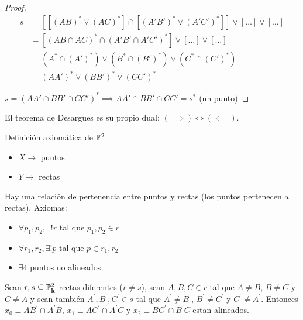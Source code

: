 \begin{proof}
\begin{align*}
    s &= \left[ \left[ \left(AB\right)^* \vee \left(AC\right)^* \right] \cap \left[ \left(A'B'\right)^* \vee \left(A'C'\right)^* \right] \right]
    \vee [\dots ] \vee [\dots] \\
    &= \left[ (AB \cap AC)^* \cap \left(A'B' \cap A'C' \right)^* \right] \vee [\dots] \vee [\dots] \\
    &= \left(A^* \cap (A')^* \right) \vee \left(B^* \cap (B')^* \right) \vee \left(C^* \cap (C')^* \right) \\
    &= (AA')^* \vee (BB')^* \vee (CC')^*
\end{align*}

$s = (AA' \cap BB' \cap CC')^* \implies AA' \cap BB' \cap CC' = s^*$ (un punto)
\end{proof}
\begin{obs}
El teorema de Desargues es su propio dual: $(\implies) \iff (\impliedby)$.
\end{obs}
\begin{obs}
Definición axiomática de $\mathbb{P}^2$
\begin{itemize}
    \item $X \rightarrow$ puntos
    \item $Y \rightarrow$ rectas
\end{itemize}
Hay una relación de pertenencia entre puntos y rectas (los puntos pertenecen a rectas). Axiomas:
\begin{itemize}
    \item $\forall p_1, p_2, \exists! r$ tal que $p_1, p_2 \in r$
    \item $\forall r_1, r_2, \exists! p$ tal que $p \in r_1, r_2$
    \item $\exists 4$ puntos no alineados
\end{itemize}
\end{obs}


\begin{thm}[ de Pappus]
Sean $r,s \subseteq \mathbb{P}^2_{\mathbf{k}}$ rectas diferentes ($r \neq s$), sean
$A,B,C \in r$ tal que $A \neq B$, $B \neq C$ y $C\neq A$ y sean también
$A^\prime,B^\prime,C^\prime \in s$ tal que $A^\prime \neq B^\prime$,
$B^\prime \neq C^\prime$ y $C^\prime \neq A^\prime$. Entonces
$x_0 \equiv AB^\prime \cap A^\prime B$, $x_1 \equiv AC^\prime \cap A^\prime C$
y $x_2 \equiv BC^\prime \cap B^\prime C$ estan alineados.
\end{thm}

